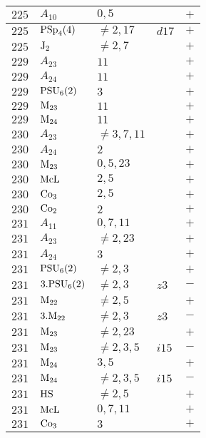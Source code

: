 \documentclass[a4paper, 11pt]{article}
\begin{document}
\begin{longtable}{lllll}
		$225$ & $A_{10}$ & $0,5$ &  & $+$ \\ \hline
		$225$ & ${\rm PSp}_{4}(4)$ & $\neq 2,17$ & $d17$ & $+$ \\ \hline
		$225$ & ${\rm J}_2$ & $\neq 2,7$ &  & $+$ \\ \hline
		$229$ & $A_{23}$ & $11$ &  & $+$ \\ \hline
		$229$ & $A_{24}$ & $11$ &  & $+$ \\ \hline
		$229$ & ${\rm PSU}_{6}(2)$ & $3$ &  & $+$ \\ \hline
		$229$ & ${\rm M}_{23}$ & $11$ &  & $+$ \\ \hline
		$229$ & ${\rm M}_{24}$ & $11$ &  & $+$ \\ \hline
		$230$ & $A_{23}$ & $\neq 3,7,11$ &  & $+$ \\ \hline
		$230$ & $A_{24}$ & $2$ &  & $+$ \\ \hline
		$230$ & ${\rm M}_{23}$ & $0,5,23$ &  & $+$ \\ \hline
		$230$ & ${\rm McL}$ & $2,5$ &  & $+$ \\ \hline
		$230$ & ${\rm Co}_{3}$ & $2,5$ &  & $+$ \\ \hline
		$230$ & ${\rm Co}_{2}$ & $2$ &  & $+$ \\ \hline
		$231$ & $A_{11}$ & $0,7,11$ &  & $+$ \\ \hline
		$231$ & $A_{23}$ & $\neq 2,23$ &  & $+$ \\ \hline
		$231$ & $A_{24}$ & $3$ &  & $+$ \\ \hline
		$231$ & ${\rm PSU}_{6}(2)$ & $\neq 2,3$ &  & $+$ \\ \hline
		$231$ & $3.{\rm PSU}_{6}(2)$ & $\neq 2,3$ & $z3$ & $-$ \\ \hline
		$231$ & ${\rm M}_{22}$ & $\neq 2,5$ &  & $+$ \\ \hline
		$231$ & $3.{\rm M}_{22}$ & $\neq 2,3$ & $z3$ & $-$ \\ \hline
		$231$ & ${\rm M}_{23}$ & $\neq 2,23$ &  & $+$ \\ \hline
		$231$ & ${\rm M}_{23}$ & $\neq 2,3,5$ & $i15$ & $-$ \\ \hline
		$231$ & ${\rm M}_{24}$ & $3,5$ &  & $+$ \\ \hline
		$231$ & ${\rm M}_{24}$ & $\neq 2,3,5$ & $i15$ & $-$ \\ \hline
		$231$ & ${\rm HS}$ & $\neq 2,5$ &  & $+$ \\ \hline
		$231$ & ${\rm McL}$ & $0,7,11$ &  & $+$ \\ \hline
		$231$ & ${\rm Co}_{3}$ & $3$ &  & $+$ \\ \hline

\end{longtable}
\end{document}
